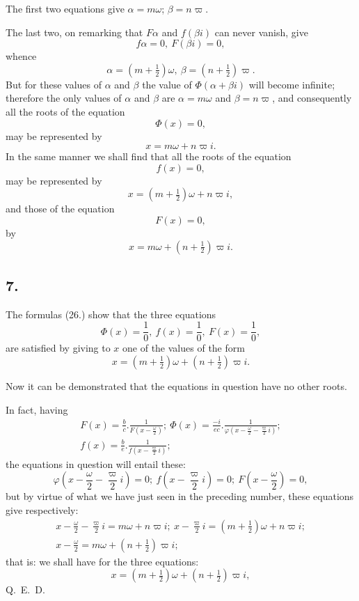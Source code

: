 \documentclass{article}
\begin{document}
The first two equations give $\alpha=m\omega$; $\beta=n\varpi$.

The last two, on remarking that $F\alpha$ and $f(\beta i)$ can never vanish, give
\[ f\alpha=0,\ F(\beta i)=0, \]
whence
\[ \alpha=(m+\tfrac{1}{2})\omega,\ \beta=(n+\tfrac{1}{2})\varpi. \]
But for these values of $\alpha$ and $\beta$ the value of $\Phi(\alpha+\beta i)$ will become infinite; therefore the only values of $\alpha$ and $\beta$ are $\alpha=m\omega$ and $\beta=n\varpi$, and consequently all the roots of the equation
\[ \Phi(x)=0, \]
may be represented by
\[ x=m\omega+n\varpi i. \tag{27.} \]
In the same manner we shall find that all the roots of the equation
\[ f(x)=0, \]
may be represented by
\[ x=(m+\tfrac{1}{2})\omega+n\varpi i, \tag{28.} \]
and those of the equation
\[ F(x)=0, \]
by
\[ x=m\omega+(n+\tfrac{1}{2})\varpi i. \tag{29.} \]


\subsection*{7.}

The formulas (26.) show that the three equations
\[ \Phi(x)=\frac{1}{0},\ f(x)=\frac{1}{0},\ F(x)=\frac{1}{0}, \]
are satisfied by giving to $x$ one of the values of the form
\[ x=(m+\tfrac{1}{2})\omega+(n+\tfrac{1}{2})\varpi i. \tag{30.} \]

Now it can be demonstrated that the equations in question have no other roots.

In fact, having
\[ \begin{gathered} F(x)=\frac{b}{c}.\frac{1}{F\left(x-\frac{\omega}{2}\right)};\ \Phi(x)=\frac{-i}{ec}.\frac{1}{\varphi\left(x-\frac{\omega}{2}-\frac{\varpi}{2}i\right)};\\ f(x)=\frac{b}{e}.\frac{1}{f\left(x-\frac{\varpi}{2}i\right)}; \end{gathered} \]
the equations in question will entail these:
\[ \varphi\left(x-\frac{\omega}{2}-\frac{\varpi}{2}i\right)=0;\ f\left(x-\frac{\varpi}{2}i\right)=0;\ F\left(x-\frac{\omega}{2}\right)=0, \]
but by virtue of what we have just seen in the preceding number, these equations give respectively:
\[ \begin{gathered} x-\frac{\omega}{2}-\frac{\varpi}{2}i=m\omega+n\varpi i;\ x-\frac{\varpi}{2}i=(m+\tfrac{1}{2})\omega+n\varpi i;\\ x-\frac{\omega}{2}=m\omega+(n+\tfrac{1}{2})\varpi i; \end{gathered} \]
that is: we shall have for the three equations:
\[ x=(m+\tfrac{1}{2})\omega+(n+\tfrac{1}{2})\varpi i, \]
Q.\ E.\ D.
\end{document}
